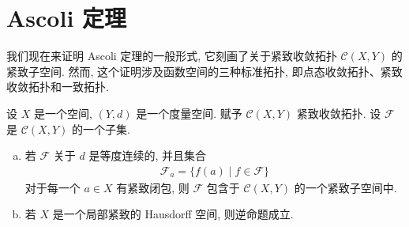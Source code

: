 \documentclass[../../main.tex]{subfiles}
\begin{document}
\section{Ascoli 定理}\label{section:ch07-ascoli}

我们现在来证明 Ascoli 定理的一般形式, 它刻画了关于紧致收敛拓扑 $\mathcal{C}(X,Y)$ 的紧致子空间. 然而, 这个证明涉及函数空间的三种标准拓扑, 即点态收敛拓扑、紧致收敛拓扑和一致拓扑.

\begin{theorem}[Ascoli 定理]\label{theorem:ch07-ascoli-general}
设 $X$ 是一个空间, $(Y,d)$ 是一个度量空间. 赋予 $\mathcal{C}(X,Y)$ 紧致收敛拓扑. 设 $\mathcal{F}$ 是 $\mathcal{C}(X,Y)$ 的一个子集.
\begin{enumerate}[(a)]
\item 若 $\mathcal{F}$ 关于 $d$ 是等度连续的, 并且集合
\begin{align*}
\mathcal{F}_a=\{f(a)\mid f\in\mathcal{F}\}
\end{align*}
对于每一个 $a\in X$ 有紧致闭包, 则 $\mathcal{F}$ 包含于 $\mathcal{C}(X,Y)$ 的一个紧致子空间中.
\item 若 $X$ 是一个局部紧致的 Hausdorff 空间, 则逆命题成立.
\end{enumerate}
\end{theorem}
\end{document}
